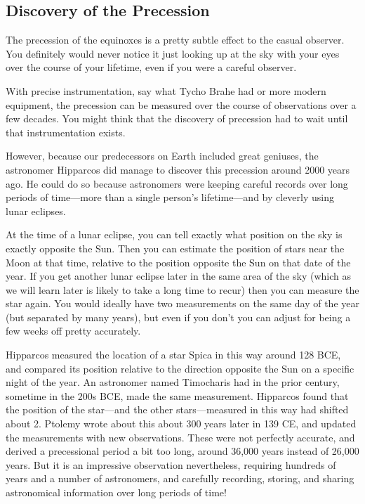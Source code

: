 \documentclass[12pt, preprint]{aastex}
\begin{document}
\subsection{Discovery of the Precession}

The precession of the equinoxes is a pretty subtle effect to the
casual observer. You definitely would never notice it just looking up
at the sky with your eyes over the course of your lifetime, even if
you were a careful observer.

With precise instrumentation, say what Tycho Brahe had or more modern
equipment, the precession can be measured over the course of
observations over a few decades. You might think that the discovery of
precession had to wait until that instrumentation exists.

However, because our predecessors on Earth included great geniuses,
the astronomer Hipparcos did manage to discover this precession around
2000 years ago. He could do so because astronomers were keeping careful
records over long periods of time---more than a single person's
lifetime---and by cleverly using lunar eclipses.

At the time of a lunar eclipse, you can tell exactly what position on
the sky is exactly opposite the Sun. Then you can estimate the
position of stars near the Moon at that time, relative to the position
opposite the Sun on that date of the year. If you get another lunar
eclipse later in the same area of the sky (which as we will learn
later is likely to take a long time to recur) then you can measure the
star again. You would ideally have two measurements on the same day of
the year (but separated by many years), but even if you don't you can
adjust for being a few weeks off pretty accurately.

Hipparcos measured the location of a star Spica in this way around 128
BCE, and compared its position relative to the direction opposite the
Sun on a specific night of the year. An astronomer named Timocharis
had in the prior century, sometime in the 200s BCE, made the same
measurement. Hipparcos found that the position of the star---and the
other stars---measured in this way had shifted about 2\degree. Ptolemy
wrote about this about 300 years later in 139 CE, and updated the
measurements with new observations. These were not perfectly accurate,
and derived a precessional period a bit too long, around 36,000 years
instead of 26,000 years. But it is an impressive observation
nevertheless, requiring hundreds of years and a number of astronomers,
and carefully recording, storing, and sharing astronomical information
over long periods of time!
\end{document}
